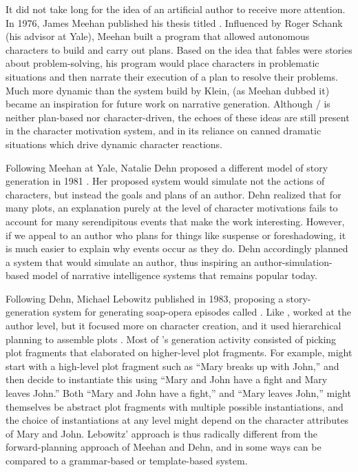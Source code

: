 It did not take long for the idea of an artificial author to receive more attention.
%
In 1976, James Meehan published his thesis titled  \citep{Meehan1976}.
%
Influenced by Roger Schank (his advisor at Yale), Meehan built a program that allowed autonomous characters to build and carry out plans.
%
Based on the idea that fables were stories about problem-solving, his program would place characters in problematic situations and then narrate their execution of a plan to resolve their problems.
%
Much more dynamic than the system build by Klein,  (as Meehan dubbed it) became an inspiration for future work on narrative generation.
%
Although \dunyazad/ is neither plan-based nor character-driven, the echoes of these ideas are still present in the character motivation system, and in its reliance on canned dramatic situations which drive dynamic character reactions.


Following Meehan at Yale, Natalie Dehn proposed a different model of story generation in 1981 \citep{Dehn1981}.
%
Her proposed system  would simulate not the actions of characters, but instead the goals and plans of an author.
%
Dehn realized that for many plots, an explanation purely at the level of character motivations fails to account for many serendipitous events that make the work interesting.
%
However, if we appeal to an author who plans for things like suspense or foreshadowing, it is much easier to explain why events occur as they do.
%
Dehn accordingly planned a system that would simulate an author, thus inspiring an author-simulation-based model of narrative intelligence systems that remains popular today.


Following Dehn, Michael Lebowitz published  in 1983, proposing a story-generation system for generating soap-opera episodes called  \citep{Lebowitz1983}.
%
Like ,  worked at the author level, but it focused more on character creation, and it used hierarchical planning to assemble plots \citep{Lebowitz1984,Lebowitz1985}.
%
Most of 's generation activity consisted of picking plot fragments that elaborated on higher-level plot fragments.
%
For example,  might start with a high-level plot fragment such as ``Mary breaks up with John,'' and then decide to instantiate this using ``Mary and John have a fight and Mary leaves John.''
%
Both ``Mary and John have a fight,'' and ``Mary leaves John,'' might themselves be abstract plot fragments with multiple possible instantiations, and the choice of instantiations at any level might depend on the character attributes of Mary and John.
%
Lebowitz'  approach is thus radically different from the forward-planning approach of Meehan and Dehn, and in some ways can be compared to a grammar-based or template-based system.


